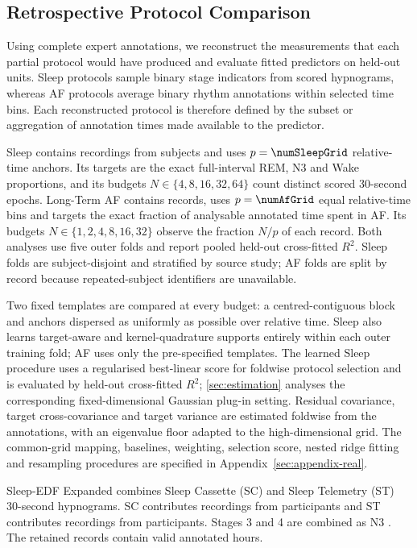 \subsection{Retrospective Protocol Comparison}
\label{sec:real}

Using complete expert annotations, we reconstruct the measurements that each
partial protocol would have produced and evaluate fitted predictors on
held-out units. Sleep protocols sample binary stage indicators from scored
hypnograms, whereas AF protocols average binary rhythm annotations within
selected time bins. Each reconstructed protocol is therefore defined by the
subset or aggregation of annotation times made available to the predictor.

Sleep contains \numSleepRecordings{} recordings from \numSleepSubjects{}
subjects and uses $p=\numSleepGrid$ relative-time anchors. Its targets are the
exact full-interval REM, N3 and Wake proportions, and its budgets
$N\in\{4,8,16,32,64\}$ count distinct scored 30-second epochs. Long-Term AF
contains \numLtafRecords{} records, uses $p=\numAfGrid$ equal relative-time
bins and targets the exact fraction of analysable annotated time spent in AF.
Its budgets $N\in\{1,2,4,8,16,32\}$ observe the fraction $N/p$ of each record.
Both analyses use five outer folds and report pooled held-out cross-fitted
$R^2$. Sleep folds are subject-disjoint and stratified by source study; AF
folds are split by record because repeated-subject identifiers are unavailable.

Two fixed templates are compared at every budget: a centred-contiguous block
and anchors dispersed as uniformly as possible over relative time. Sleep also
learns target-aware and kernel-quadrature supports entirely within each outer
training fold; AF uses only the pre-specified templates. The learned Sleep
procedure uses a regularised best-linear score for foldwise protocol selection
and is evaluated by held-out cross-fitted $R^2$; \cref{sec:estimation}
analyses the corresponding fixed-dimensional Gaussian plug-in setting.
Residual covariance, target cross-covariance and target variance are estimated
foldwise from the annotations, with an eigenvalue floor adapted to the
high-dimensional grid.
The common-grid mapping, baselines, weighting, selection score, nested ridge
fitting and resampling procedures are specified in
Appendix~\ref{sec:appendix-real}.

Sleep-EDF Expanded \citep{kemp2000analysis,mourtazaev1995age,
goldberger2000physiobank,pollard2026physionet} combines Sleep Cassette (SC) and
Sleep Telemetry (ST) 30-second hypnograms. SC contributes
\numSleepScRecords{} recordings from \numSleepScSubjects{} participants and ST
contributes \numSleepStRecords{} recordings from \numSleepStSubjects{}
participants. Stages 3 and 4 are combined as N3
\citep{rechtschaffen1968manual,iber2007aasm}. The retained records contain
\numSleepHours{} valid annotated hours.


